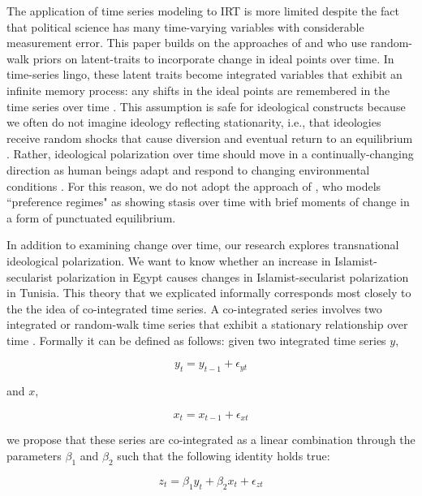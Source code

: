 \documentclass[12pt]{article}
\begin{document}
The application of time series modeling to IRT is more limited despite the fact that political science has many time-varying variables with considerable measurement error. This paper builds on the approaches of \textcite{quinn2002} and \textcite{kropko2013} who use random-walk priors on latent-traits to incorporate change in ideal points over time. In time-series lingo, these latent traits become integrated variables that exhibit an infinite memory process: any shifts in the ideal points are remembered in the time series over time \parencite[Ch. 5]{timeseries2014}. This assumption is safe for ideological constructs because we often do not imagine ideology reflecting stationarity, i.e., that ideologies receive random shocks that cause diversion and eventual return to an equilibrium \parencite[Ch. 2]{timeseries2014}. Rather, ideological polarization over time should move in a continually-changing direction as human beings adapt and respond to changing environmental conditions \parencite{owen2010clash}. For this reason, we do not adopt the approach of \textcite{park2011}, who models ``preference regimes" as showing stasis over time with brief moments of change in a form of punctuated equilibrium.

In addition to examining change over time, our research explores transnational ideological polarization. We want to know whether an increase in Islamist-secularist polarization in Egypt causes changes in Islamist-secularist polarization in Tunisia. This theory that we explicated informally corresponds most closely to the the idea of co-integrated time series. A co-integrated series involves two integrated or random-walk time series that exhibit a stationary relationship over time \parencite{engle1987}. Formally it can be defined as follows: given two integrated time series  $y$,

\begin{equation}
	y_t = y_{t-1} + \epsilon_{yt}
\end{equation}

and $x$,

\begin{equation}
x_t = x_{t-1} + \epsilon_{xt}
\end{equation}

we propose that these series are co-integrated as a linear combination through the parameters $\beta_1$ and $\beta_2$ such that the following identity holds true:

\begin{equation}
z_t = \beta_1 y_t + \beta_2 x_t + \epsilon_{zt}
\end{equation}
\end{document}
